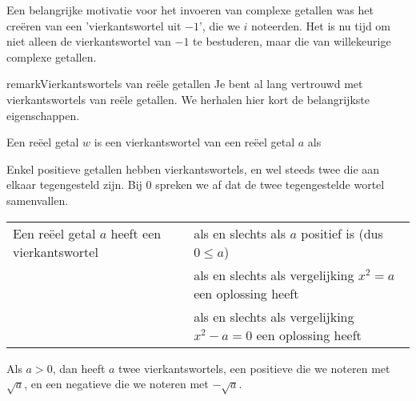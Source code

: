 \documentclass{ximera}
\begin{document}
	\author{Wim Obbels}
	\label{xim:cmplx_vierkantswortels}

    Een belangrijke motivatie voor het invoeren van complexe getallen was het creëren van een 'vierkantswortel uit $-1$', die we $i$ noteerden.
    Het is nu tijd om niet alleen de vierkantswortel van $-1$ te bestuderen, maar die van willekeurige complexe getallen.


    \begin{expandable}{remark}{Vierkantswortels van reële getallen}
        Je bent al lang vertrouwd met vierkantswortels van reële getallen. We herhalen hier kort de belangrijkste eigenschappen.

        \begin{definition}\nl

            Een reëel getal $w$ is een {vierkantswortel} van een reëel getal $a$ als 
        \end{definition}

        Enkel positieve getallen hebben vierkantswortels, en wel steeds twee die aan elkaar tegengesteld zijn. Bij $0$ spreken we af dat de twee tegengestelde wortel samenvallen.
        \begin{proposition}\nl

            \begin{tabular}{@{}l@{ }l}
            Een reëel getal $a$ heeft een vierkantswortel & als en slechts als $a$ positief is (dus $0\leq a$) \\
                                                          & als en slechts als vergelijking $x^2 = a$ een oplossing heeft \\
                                                          & als en slechts als vergelijking $x^2 - a = 0 $ een oplossing heeft 
            \end{tabular}

            Als $a>0$, dan heeft $a$ twee vierkantswortels, een positieve die we noteren met $\sqrt{a}$, en een negatieve die we noteren met $-\sqrt{a}$.
        \end{proposition}


\end{expandable}
\end{document}
